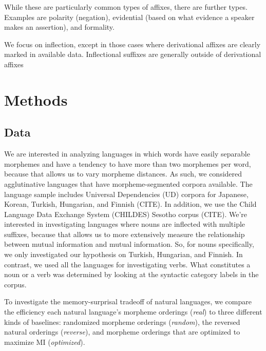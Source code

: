 \documentclass[11pt,letterpaper]{article}
\begin{document}
While these are particularly common types of affixes, there are further types.
Examples are polarity (negation), evidential (based on what evidence a speaker makes an assertion), and formality.



We focus on inflection, except in those cases where derivational affixes are clearly marked in available data.
Inflectional suffixes are generally outside of derivational affixes


\section{Methods}

\subsection{Data} %

We are interested in analyzing languages in which words have easily separable morphemes and have a tendency to have more than two morphemes per word, because that allows us to vary morpheme distances. As such, we considered agglutinative languages that have morpheme-segmented corpora available. The language sample includes Universal Dependencies (UD) corpora for Japanese, Korean, Turkish, Hungarian, and Finnish (CITE). In addition, we use the Child Language Data Exchange System (CHILDES) Sesotho corpus (CITE). 
We're interested in investigating languages where nouns are inflected with multiple suffixes, because that allows us to more extensively measure the relationship between mutual information and mutual information. So, for nouns specifically, we only investigated our hypothesis on Turkish, Hungarian, and Finnish. In contrast, we used all the languages for investigating verbs. What constitutes a noun or a verb was determined by looking at the syntactic category labels in the corpus. 

To investigate the memory-surprisal tradeoff of natural languages, we compare the efficiency each natural language's morpheme orderings (\textit{real}) to three different kinds of baselines: randomized morpheme orderings (\textit{random}), the reversed natural orderings (\textit{reverse}), and morpheme orderings that are optimized to maximize MI (\textit{optimized}). 
\end{document}
